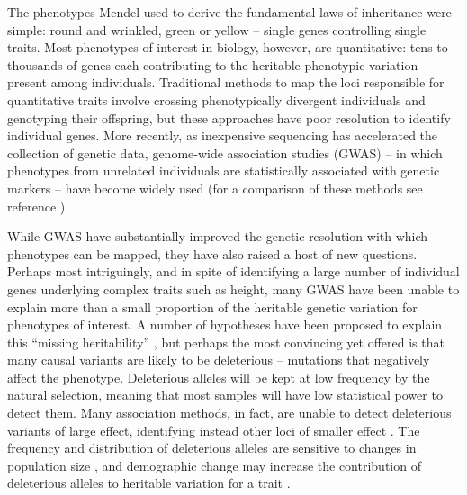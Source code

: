 %
%
%

The phenotypes Mendel used to derive the fundamental laws of inheritance were simple: round and wrinkled, green or yellow -- single genes controlling single traits. 
Most phenotypes of interest in biology, however, are quantitative: tens to thousands of genes each contributing to the heritable phenotypic variation present among individuals.
Traditional methods to map the loci responsible for quantitative traits involve crossing phenotypically divergent individuals and genotyping their offspring, but these approaches have poor resolution to identify individual genes. 
More recently, as inexpensive sequencing has accelerated the collection of genetic data, genome-wide association studies (GWAS) -- in which phenotypes from unrelated individuals are statistically associated with genetic markers -- have become widely used (for a comparison of these methods see reference \citep{morrell2011crop}).

While GWAS have substantially improved the genetic resolution with which phenotypes can be mapped, they have also raised a host of new questions. 
Perhaps most intriguingly, and in spite of identifying a large number of individual genes underlying complex traits such as height, many GWAS have been unable to explain more than a small proportion of the heritable genetic variation for phenotypes of interest.  
A number of hypotheses have been proposed to explain this ``missing heritability''  \citep{gibson2012rare}, but perhaps the most convincing yet offered is that many causal variants are likely to be deleterious -- mutations that negatively affect the phenotype.
Deleterious alleles will be kept at low frequency by the natural selection, meaning that most samples will have low statistical power to detect them.
Many association methods, in fact, are unable to detect deleterious variants of large effect, identifying instead other loci of smaller effect \citep{Thornton2013}.
The frequency and distribution of deleterious alleles are sensitive to changes in population size \citep{Fu2014}, and demographic change may increase the contribution of deleterious alleles to heritable variation for a trait \citep{Lohmueller2014}. 

